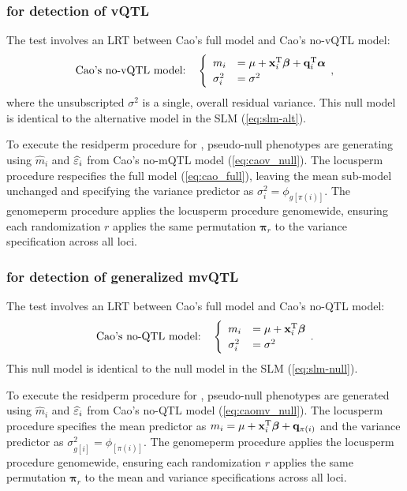   \subsubsection{\Caov for detection of vQTL}
    The \Caov test involves an LRT between {Cao's full model} and {Cao's no-vQTL model}:
    \begin{equation}\label{eq:caov_null}
      \text{Cao's no-vQTL model:}\quad
      \begin{cases}
        \enskip m_i &= \mu + \mathbf{x}_i^\mathrm{T}\bm{\beta} + \mathbf{q}_i^\mathrm{T}\bm{\alpha}\\
        \enskip \sigma_i^2 &= \sigma^2
      \end{cases}
      \,,
    \end{equation}
    where the unsubscripted $\sigma^2$ is a single, overall residual variance. This null model is identical to the alternative model in the SLM (\autoref{eq:slm-alt}).

    To execute the residperm procedure for \Caov, pseudo-null phenotypes are generating using $\widehat{m}_i$ and $\widehat{\varepsilon}_i$ from Cao's no-mQTL model (\autoref{eq:caov_null}).
    The locusperm procedure respecifies the full model (\autoref{eq:cao_full}), leaving the mean sub-model unchanged and specifying the variance predictor as $\sigma_i^2 = \phi_{g[\pi(i)]}$.
    The genomeperm procedure applies the locusperm procedure genomewide, ensuring each randomization $r$ applies the same permutation $\bm{\pi}_r$ to the variance specification across all loci.

  \subsubsection{\Caomv for detection of generalized mvQTL}
    The \Caomv test involves an LRT between {Cao's full model} and {Cao's no-QTL model}:
    \begin{equation}\label{eq:caomv_null}
    \text{Cao's no-QTL model:}\quad
    \begin{cases}
      \enskip m_i &= \mu + \mathbf{x}_i^\mathrm{T}\bm{\beta}\\
      \enskip \sigma_i^2 &= \sigma^2
    \end{cases}
    \,.
    \end{equation}
    This null model is identical to the null model in the SLM (\autoref{eq:slm-null}).

    To execute the residperm procedure for \Caomv, pseudo-null phenotypes are generated using $\widehat{m}_i$ and $\widehat{\varepsilon}_i$ from Cao's no-QTL model (\autoref{eq:caomv_null}).
    The locusperm procedure specifies the mean predictor as $m_i = \mu + \mathbf{x}_i^\mathrm{T}\bm{\beta} + \mathbf{q}_{\pi(i)}$ and the variance predictor as $\sigma_{g[i]}^2 = \phi_{[\pi(i)]}$.
    The genomeperm procedure applies the locusperm procedure genomewide, ensuring each randomization $r$ applies the same permutation $\bm{\pi}_r$ to the mean and variance specifications across all loci.


